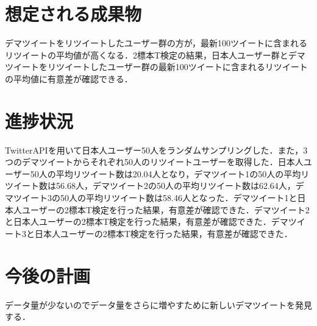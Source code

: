 \documentclass[uplatex,twocolumn,dvipdfmx]{jsarticle}
\begin{document}
\section{想定される成果物}
デマツイートをリツイートしたユーザー群の方が，最新100ツイートに含まれるリツイートの平均値が高くなる．2標本T検定の結果，日本人ユーザー群とデマツイートをリツイートしたユーザー群の最新100ツイートに含まれるリツイートの平均値に有意差が確認できる．

\section{進捗状況}
TwitterAPIを用いて日本人ユーザー50人をランダムサンプリングした．また，3つのデマツイートからそれぞれ50人のリツイートユーザーを取得した．日本人ユーザー50人の平均リツイート数は20.04人となり，デマツイート1の50人の平均リツイート数は56.68人，デマツイート2の50人の平均リツイート数は62.64人，デマツイート3の50人の平均リツイート数は58.46人となった．デマツイート1と日本人ユーザーの2標本T検定を行った結果，有意差が確認できた．デマツイート2と日本人ユーザーの2標本T検定を行った結果，有意差が確認できた．デマツイート3と日本人ユーザーの2標本T検定を行った結果，有意差が確認できた．

\section{今後の計画}
データ量が少ないのでデータ量をさらに増やすために新しいデマツイートを発見する．


\end{document}
